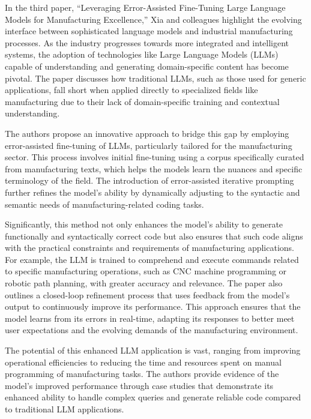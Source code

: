\documentclass[journal,transmag]{IEEEtran}
\begin{document}
In the third paper, “Leveraging Error-Assisted Fine-Tuning Large Language Models for Manufacturing Excellence,”\cite{xia2024leveraging} Xia and colleagues highlight the evolving interface between sophisticated language models and industrial manufacturing processes. As the industry progresses towards more integrated and intelligent systems, the adoption of technologies like Large Language Models (LLMs) capable of understanding and generating domain-specific content has become pivotal. The paper discusses how traditional LLMs, such as those used for generic applications, fall short when applied directly to specialized fields like manufacturing due to their lack of domain-specific training and contextual understanding.

The authors propose an innovative approach to bridge this gap by employing error-assisted fine-tuning of LLMs, particularly tailored for the manufacturing sector. This process involves initial fine-tuning using a corpus specifically curated from manufacturing texts, which helps the models learn the nuances and specific terminology of the field. The introduction of error-assisted iterative prompting further refines the model’s ability by dynamically adjusting to the syntactic and semantic needs of manufacturing-related coding tasks.

Significantly, this method not only enhances the model’s ability to generate functionally and syntactically correct code but also ensures that such code aligns with the practical constraints and requirements of manufacturing applications. For example, the LLM is trained to comprehend and execute commands related to specific manufacturing operations, such as CNC machine programming or robotic path planning, with greater accuracy and relevance.
The paper also outlines a closed-loop refinement process that uses feedback from the model’s output to continuously improve its performance. This approach ensures that the model learns from its errors in real-time, adapting its responses to better meet user expectations and the evolving demands of the manufacturing environment.

The potential of this enhanced LLM application is vast, ranging from improving operational efficiencies to reducing the time and resources spent on manual programming of manufacturing tasks. The authors provide evidence of the model’s improved performance through case studies that demonstrate its enhanced ability to handle complex queries and generate reliable code compared to traditional LLM applications.
\end{document}
